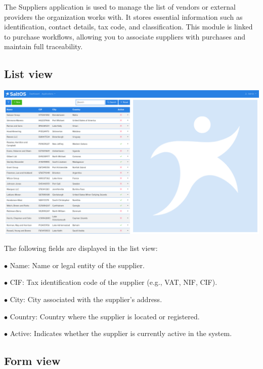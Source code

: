 \documentclass[a4paper]{article}
\begin{document}
The Suppliers application is used to manage the list of vendors or external providers the organization works with.
It stores essential information such as identification, contact details, tax code, and classification.
This module is linked to purchase workflows, allowing you to associate suppliers with purchases and maintain full traceability.

\hypertarget{toc128}{}
\subsection{List view}

\begin{center}\includegraphics[width=1\textwidth]{../ujest/snaps/test-screenshots-js-screenshots-purchases-suppliers-list-en-us-1-snap.png}\end{center}

The following fields are displayed in the list view:

\begin{compactitem}
\item[\color{myblue}$\bullet$] Name: Name or legal entity of the supplier.
\item[\color{myblue}$\bullet$] CIF: Tax identification code of the supplier (e.g., VAT, NIF, CIF).
\item[\color{myblue}$\bullet$] City: City associated with the supplier's address.
\item[\color{myblue}$\bullet$] Country: Country where the supplier is located or registered.
\item[\color{myblue}$\bullet$] Active: Indicates whether the supplier is currently active in the system.
\end{compactitem}

\hypertarget{toc129}{}
\subsection{Form view}
\end{document}
